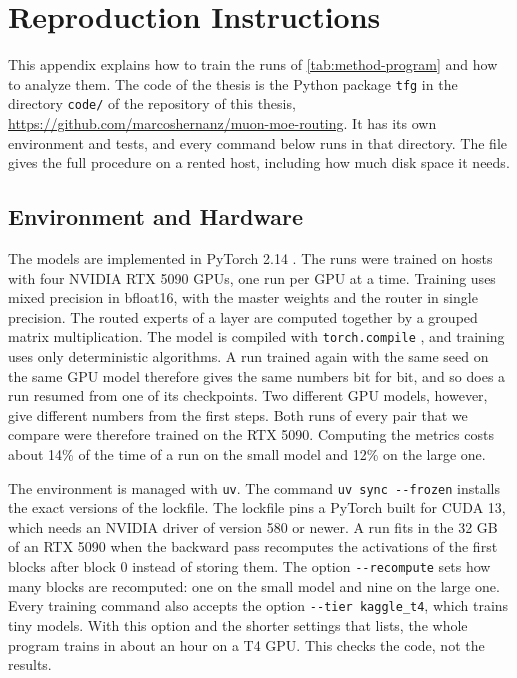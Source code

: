 \chapter{Reproduction Instructions}
\label{app:reproduction}

This appendix explains how to train the runs of \cref{tab:method-program} and how to analyze them. The code of the thesis is the Python package \texttt{tfg} in the directory \texttt{code/} of the repository of this thesis, \url{https://github.com/marcoshernanz/muon-moe-routing}. It has its own environment and tests, and every command below runs in that directory. The file  gives the full procedure on a rented host, including how much disk space it needs.

\section{Environment and Hardware}
\label{app:reproduction-environment}
The models are implemented in PyTorch 2.14 \cite{paszke2019pytorch}. The runs were trained on hosts with four NVIDIA RTX 5090 GPUs, one run per GPU at a time. Training uses mixed precision in bfloat16, with the master weights and the router in single precision. The routed experts of a layer are computed together by a grouped matrix multiplication. The model is compiled with \texttt{torch.compile} \cite{ansel2024pytorch2}, and training uses only deterministic algorithms. A run trained again with the same seed on the same GPU model therefore gives the same numbers bit for bit, and so does a run resumed from one of its checkpoints. Two different GPU models, however, give different numbers from the first steps. Both runs of every pair that we compare were therefore trained on the RTX 5090. Computing the metrics costs about 14\% of the time of a run on the small model and 12\% on the large one.

The environment is managed with \texttt{uv}. The command \texttt{uv sync -{}-frozen} installs the exact versions of the lockfile. The lockfile pins a PyTorch built for CUDA 13, which needs an NVIDIA driver of version 580 or newer. A run fits in the 32 GB of an RTX 5090 when the backward pass recomputes the activations of the first blocks after block 0 instead of storing them. The option \texttt{-{}-recompute} sets how many blocks are recomputed: one on the small model and nine on the large one. Every training command also accepts the option \texttt{-{}-tier kaggle\_t4}, which trains tiny models. With this option and the shorter settings that  lists, the whole program trains in about an hour on a T4 GPU\@. This checks the code, not the results.

